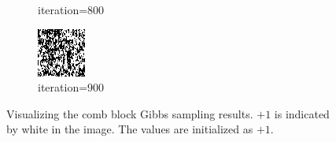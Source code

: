 \documentclass{article}
\begin{document}
\begin{figure}[h]
\begin{subfigure}[t]{0.18\textwidth}
\vspace{-0.6cm}
\caption{iteration=800}
\end{subfigure}\hspace{0.01\textwidth}
\begin{subfigure}[t]{0.18\textwidth}
\centering
\includegraphics[width=\textwidth]{./computational/results/gibbs_comb_sampler_positive_iter_900.png}
\vspace{-0.6cm}
\caption{iteration=900}
\end{subfigure}\hspace{0.01\textwidth}
\caption{Visualizing the comb block Gibbs sampling results. $+1$ is indicated by white in the image. The values are initialized as $+1$.}
\label{f:63c}
\end{figure}
%
\end{document}

